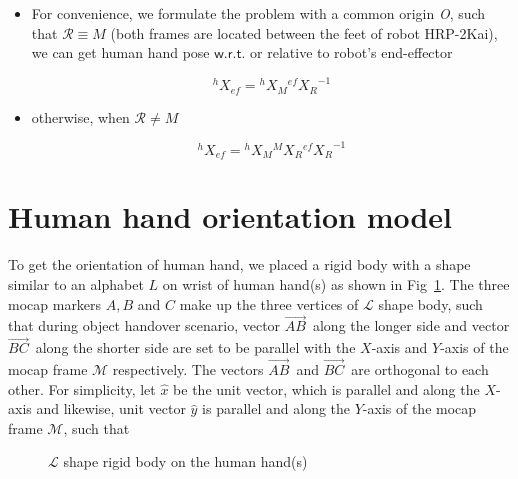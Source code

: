 \documentclass[a4paper, 12pt, oneside]{Thesis}  %
\begin{document}
\begin{itemize}
	\item For convenience, we formulate the problem with a common origin {\it O}, such that $\mathcal R \equiv M$ (both frames are located between the feet of robot HRP-2Kai), we can get human hand pose $\mathsf{w.r.t.}$ or relative to robot's end-effector
	
	\begin{equation}\label{X_ef_h1}
	{}^{h}{X}_{ef} = {}^{h}{X}_{M}  {}^{ef}{X_{R}}^{-1}
	\end{equation}
	\item otherwise, when $\mathcal R \neq M$
	
	\begin{equation}\label{X_ef_h2}
	{}^{h}{X}_{ef} = {}^{h}{X}_{M}  {}^{M}{X}_R  {}^{ef}{X_{R}}^{-1}
	\end{equation}
	
\end{itemize}

\clearpage

\section{Human hand orientation model}\label{hand_orientation}
To get the orientation of human hand, we placed a rigid body with a shape similar to an alphabet $L$ on wrist of human hand(s) as shown in Fig~\ref{fig:lshapes}. The three mocap markers $A, B$ and $C$ make up the three vertices of $\mathcal{L}$ shape body, such that during object handover scenario, vector $\vec{AB}^{\,}$ along the longer side and vector $\vec{BC}^{\,}$ along the shorter side are set to be parallel with the $X$-axis and $Y$-axis of the mocap frame $\mathcal{M}$ respectively. The vectors $\vec{AB}^{\,}$ and $\vec{BC}^{\,}$ are orthogonal to each other. For simplicity, let $\hat{x}$ be the unit vector, which is parallel and along the $X$-axis and likewise, unit vector $\hat{y}$ is parallel and along the $Y$-axis of the mocap frame $\mathcal{M}$, such that

\begin{figure}[ht]
	\caption{$\mathcal{L}$ shape rigid body on the human hand(s)}
	\label{fig:lshapes}
\end{figure}
\end{document}
